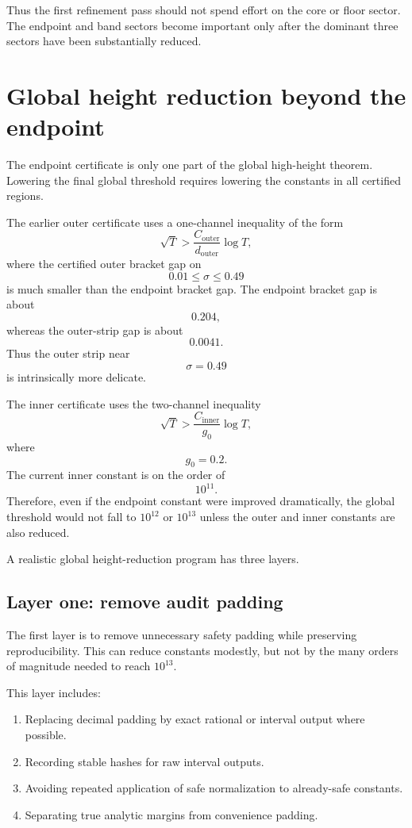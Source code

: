 \documentclass[11pt]{article}
\begin{document}
Thus the first refinement pass should not spend effort on the core or floor sector.  The endpoint and band sectors become important only after the dominant three sectors have been substantially reduced.

\section{Global height reduction beyond the endpoint}

The endpoint certificate is only one part of the global high-height theorem.  Lowering the final global threshold requires lowering the constants in all certified regions.

The earlier outer certificate uses a one-channel inequality of the form
\[
\sqrt{T}>
\frac{C_{\mathrm{outer}}}{d_{\mathrm{outer}}}\log T,
\]
where the certified outer bracket gap on
\[
0.01\leq\sigma\leq0.49
\]
is much smaller than the endpoint bracket gap.  The endpoint bracket gap is about
\[
0.204,
\]
whereas the outer-strip gap is about
\[
0.0041.
\]
Thus the outer strip near
\[
\sigma=0.49
\]
is intrinsically more delicate.

The inner certificate uses the two-channel inequality
\[
\sqrt{T}>
\frac{C_{\mathrm{inner}}}{g_0}\log T,
\]
where
\[
g_0=0.2.
\]
The current inner constant is on the order of
\[
10^{11}.
\]
Therefore, even if the endpoint constant were improved dramatically, the global threshold would not fall to \(10^{12}\) or \(10^{13}\) unless the outer and inner constants are also reduced.

A realistic global height-reduction program has three layers.

\subsection{Layer one: remove audit padding}

The first layer is to remove unnecessary safety padding while preserving reproducibility.  This can reduce constants modestly, but not by the many orders of magnitude needed to reach \(10^{13}\).

This layer includes:

\begin{enumerate}[label=\arabic*.]
\item Replacing decimal padding by exact rational or interval output where possible.
\item Recording stable hashes for raw interval outputs.
\item Avoiding repeated application of safe normalization to already-safe constants.
\item Separating true analytic margins from convenience padding.
\end{enumerate}
\end{document}

